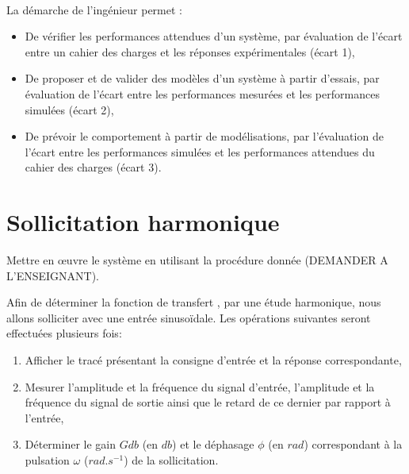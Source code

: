 
%


 \\

\graphicspath{{../../img/}}
\begin{center}
\def\svgwidth{\columnwidth}

\end{center}

La démarche de l’ingénieur permet :
\begin{itemize}
 \item De vérifier les performances attendues d’un système, par évaluation de l’écart entre un cahier des charges et les réponses expérimentales (écart 1),
 \item De proposer et de valider des modèles d’un système à partir d’essais, par évaluation de l’écart entre les performances mesurées et les performances simulées (écart 2),
 \item De prévoir le comportement à partir de modélisations, par l’évaluation de l’écart entre les performances simulées et les performances attendues du cahier des charges (écart 3).
\end{itemize}


\newpage

\section{Sollicitation harmonique}

Mettre en \oe uvre le système en utilisant la procédure donnée (DEMANDER A L'ENSEIGNANT).

Afin de déterminer la fonction de transfert \dusysteme, par une étude harmonique, nous allons \le solliciter avec une entrée sinusoïdale. Les opérations suivantes seront effectuées plusieurs fois:
\begin{enumerate}
 \item Afficher le tracé présentant la consigne d'entrée et la réponse correspondante,
 \item Mesurer l'amplitude et la fréquence du signal d'entrée, l'amplitude et la fréquence du signal de sortie ainsi que le retard de ce dernier par rapport à l'entrée,
 \item Déterminer le gain $Gdb$ (en $db$) et le déphasage $\phi$ (en $rad$) correspondant à la pulsation $\omega$ ($rad.s^{-1}$) de la sollicitation.
\end{enumerate}

